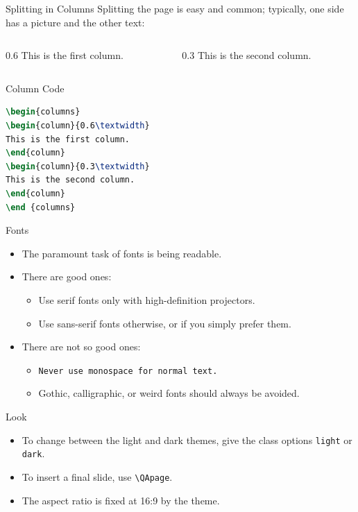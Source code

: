 \begin{frame}[fragile]{Splitting in Columns}
Splitting the page is easy and common; typically, one side has a picture and the other text:
\begin{columns}
\begin{column}{0.6\textwidth}
This is the first column.
\end{column}
\begin{column}{0.3\textwidth}
This is the second column.
\end{column}
\end{columns}
\begin{block}{Column Code}
\begin{lstlisting}[language=TeX]
\begin{columns}
\begin{column}{0.6\textwidth}
This is the first column.
\end{column}
\begin{column}{0.3\textwidth}
This is the second column.
\end{column}
\end {columns}
\end{lstlisting}
\end{block}
\end{frame}

\begin{frame}{Fonts}
\begin{itemize}
\item The paramount task of fonts is being readable.
\item There are good ones:
\begin{itemize}
\item {\textrm{Use serif fonts only with high-definition projectors.}}
\item {\textsf{Use sans-serif fonts otherwise, or if you simply prefer them.}}
\end{itemize}
\item There are not so good ones:
\begin{itemize}
\item {\texttt{Never use monospace for normal text.}}
\item {\frakfamily Gothic, calligraphic, or weird fonts should always be avoided.}
\end{itemize}
\end{itemize}
\end{frame}

\begin{frame}[fragile]{Look}
\begin{itemize}
\item To change between the light and dark themes, give the class options \texttt{light} or \texttt{dark}.
\item To insert a final slide, use \verb|\QApage|.
\item The aspect ratio is fixed at 16:9 by the theme.
\end{itemize}
\end{frame}

